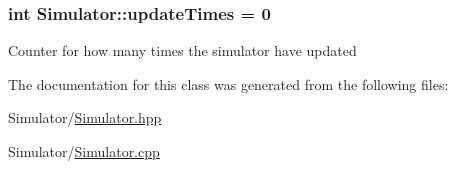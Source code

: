 \subsubsection[{\texorpdfstring{update\+Times}{updateTimes}}]{\setlength{\rightskip}{0pt plus 5cm}int Simulator\+::update\+Times = 0\hspace{0.3cm}{\ttfamily [static]}}\hypertarget{classSimulator_a0173a212ad88cce09b31e4d65a0e94a8}{}\label{classSimulator_a0173a212ad88cce09b31e4d65a0e94a8}
Counter for how many times the simulator have updated 

The documentation for this class was generated from the following files\+:\begin{DoxyCompactItemize}
\item 
Simulator/\hyperlink{Simulator_8hpp}{Simulator.\+hpp}\item 
Simulator/\hyperlink{Simulator_8cpp}{Simulator.\+cpp}\end{DoxyCompactItemize}
